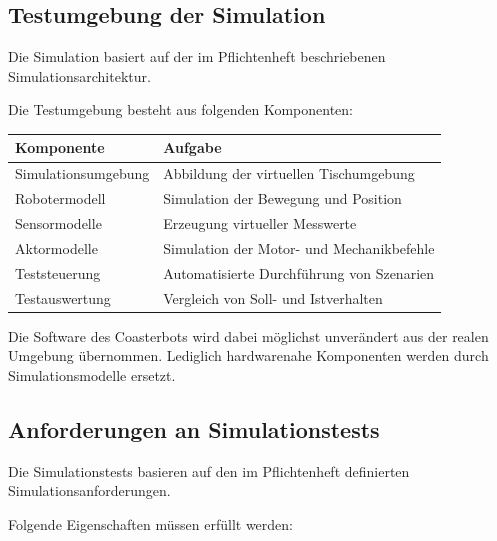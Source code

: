 \documentclass[
  a4paper,
  12pt,
  DIV=12,        %
  parskip=half,  %
  headings=small %
]{scrartcl}
\theoremstyle{definition}
\theoremstyle{definition}
\begin{document}
\subsection{Testumgebung der
Simulation}\label{testumgebung-der-simulation}

Die Simulation basiert auf der im Pflichtenheft beschriebenen
Simulationsarchitektur.

Die Testumgebung besteht aus folgenden Komponenten:

\begin{longtable}[]{@{}ll@{}}
\toprule\noalign{}
Komponente & Aufgabe \\
\midrule\noalign{}
\endhead
\bottomrule\noalign{}
\endlastfoot
Simulationsumgebung & Abbildung der virtuellen Tischumgebung \\
Robotermodell & Simulation der Bewegung und Position \\
Sensormodelle & Erzeugung virtueller Messwerte \\
Aktormodelle & Simulation der Motor- und Mechanikbefehle \\
Teststeuerung & Automatisierte Durchführung von Szenarien \\
Testauswertung & Vergleich von Soll- und Istverhalten \\
\end{longtable}

Die Software des Coasterbots wird dabei möglichst unverändert aus der
realen Umgebung übernommen. Lediglich hardwarenahe Komponenten werden
durch Simulationsmodelle ersetzt.

\subsection{Anforderungen an
Simulationstests}\label{anforderungen-an-simulationstests}

Die Simulationstests basieren auf den im Pflichtenheft definierten
Simulationsanforderungen.

Folgende Eigenschaften müssen erfüllt werden:
\end{document}
